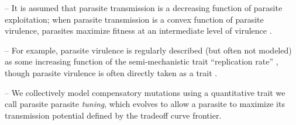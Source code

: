 -- It is assumed that parasite transmission is a decreasing function of parasite exploitation; when parasite transmission is a convex function of parasite virulence, parasites maximize fitness at an intermediate level of virulence \citep{AndersonandMay1982, Alizonetal.2009}. 

-- For example, parasite virulence is regularly described (but often not modeled) as some increasing function of the semi-mechanistic trait ``replication rate'' \citep{ AlizonandvanBaalen2005, Bolkeretal.2010}, though parasite virulence is often directly taken as a trait \citep{AndersonandMay1982, AlizonandMichalakis2015}. 

-- We collectively model compensatory mutations using a quantitative trait we call parasite parasite \emph{tuning}, which evolves to allow a parasite to maximize its transmission potential defined by the tradeoff curve frontier.


